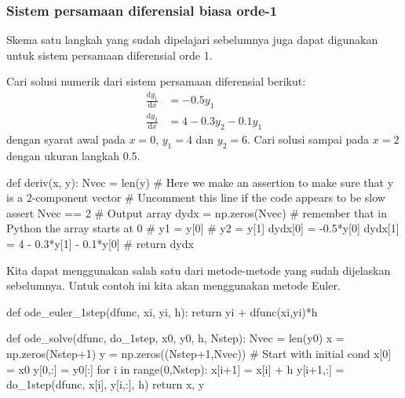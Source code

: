 \begin{frame}
\frametitle{Sistem persamaan diferensial biasa orde-1}

Skema satu langkah yang sudah dipelajari sebelumnya juga dapat digunakan
untuk sistem persamaan diferensial orde 1.

Cari solusi numerik dari sistem persamaan diferensial berikut:
\begin{align*}
\frac{\mathrm{d}y_1}{\mathrm{d}x} & = -0.5 y_1 \\
\frac{\mathrm{d}y_2}{\mathrm{d}x} & = 4 - 0.3 y_2 - 0.1y_1
\end{align*}
dengan syarat awal pada $x=0$, $y_1 = 4$ dan $y_2 = 6$.
Cari solusi sampai pada $x=2$ dengan ukuran langkah 0.5.

\end{frame}




\begin{frame}[fragile]


\begin{pythoncode}
def deriv(x, y):
    Nvec = len(y)
    # Here we make an assertion to make sure that y is a 2-component vector
    # Uncomment this line if the code appears to be slow
    assert Nvec == 2
    # Output array
    dydx = np.zeros(Nvec)
    # remember that in Python the array starts at 0
    # y1 = y[0]
    # y2 = y[1]
    dydx[0] = -0.5*y[0]
    dydx[1] = 4 - 0.3*y[1] - 0.1*y[0]
    # 
    return dydx
\end{pythoncode}
\end{frame}





\begin{frame}[fragile]

Kita dapat menggunakan salah satu dari metode-metode yang sudah dijelaskan sebelumnya.
Untuk contoh ini kita akan menggunakan metode Euler.

\begin{pythoncode}
def ode_euler_1step(dfunc, xi, yi, h):
    return yi + dfunc(xi,yi)*h
    
def ode_solve(dfunc, do_1step, x0, y0, h, Nstep):
    Nvec = len(y0)
    x = np.zeros(Nstep+1)
    y = np.zeros((Nstep+1,Nvec))
    # Start with initial cond
    x[0] = x0
    y[0,:] = y0[:]
    for i in range(0,Nstep):
        x[i+1] = x[i] + h
        y[i+1,:] = do_1step(dfunc, x[i], y[i,:], h)
    return x, y
\end{pythoncode}
\end{frame}


